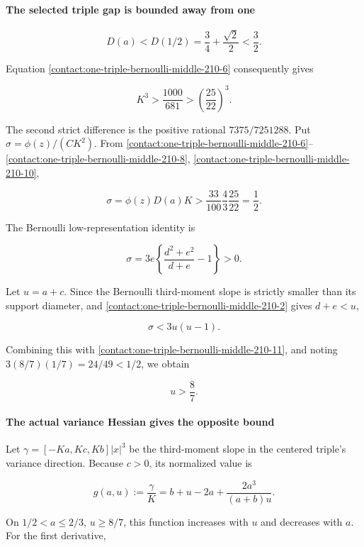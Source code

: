 \paragraph{The selected triple gap is bounded away from one}

\[
 D(a)<D(1/2)=\frac34+\frac{\sqrt2}{2}<\frac32.
\]

Equation \eqref{contact:one-triple-bernoulli-middle-210-6} consequently gives

\[
 K^3>\frac{1000}{681}>\left(\frac{25}{22}\right)^3.
\tag{B.11.10}\label{contact:one-triple-bernoulli-middle-210-10}
\]

The second strict difference is the positive rational
$7375/7251288$. Put $\sigma=\phi(z)/(CK^2)$. From \eqref{contact:one-triple-bernoulli-middle-210-6}--\eqref{contact:one-triple-bernoulli-middle-210-8}, \eqref{contact:one-triple-bernoulli-middle-210-10},

\[
 \sigma=\phi(z)D(a)K
 >\frac{33}{100}\frac43\frac{25}{22}=\frac12.
\tag{B.11.11}\label{contact:one-triple-bernoulli-middle-210-11}
\]

The Bernoulli low-representation identity is

\[
 \sigma=3e\left\{\frac{d^2+e^2}{d+e}-1\right\}>0.
\]

Let $u=a+c$. Since the Bernoulli third-moment slope is strictly smaller
than its support diameter, and \eqref{contact:one-triple-bernoulli-middle-210-2} gives $d+e<u$,

\[
 \sigma<3u(u-1).
\]

Combining this with \eqref{contact:one-triple-bernoulli-middle-210-11}, and noting $3(8/7)(1/7)=24/49<1/2$,
we obtain

\[
 \boxed{\quad u>\frac87.\quad}
\tag{B.11.12}\label{contact:one-triple-bernoulli-middle-210-12}
\]

\paragraph{The actual variance Hessian gives the opposite bound}

Let $\gamma=[-Ka,Kc,Kb]|x|^3$ be the third-moment slope in the centered
triple's variance direction. Because $c>0$, its normalized value is

\[
 g(a,u):=\frac\gamma K
   =b+u-2a+\frac{2a^3}{(a+b)u}.
\tag{B.11.13}\label{contact:one-triple-bernoulli-middle-210-13}
\]

On $1/2<a\le 2/3$, $u\ge 8/7$, this function increases with $u$ and
decreases with $a$. For the first derivative,

